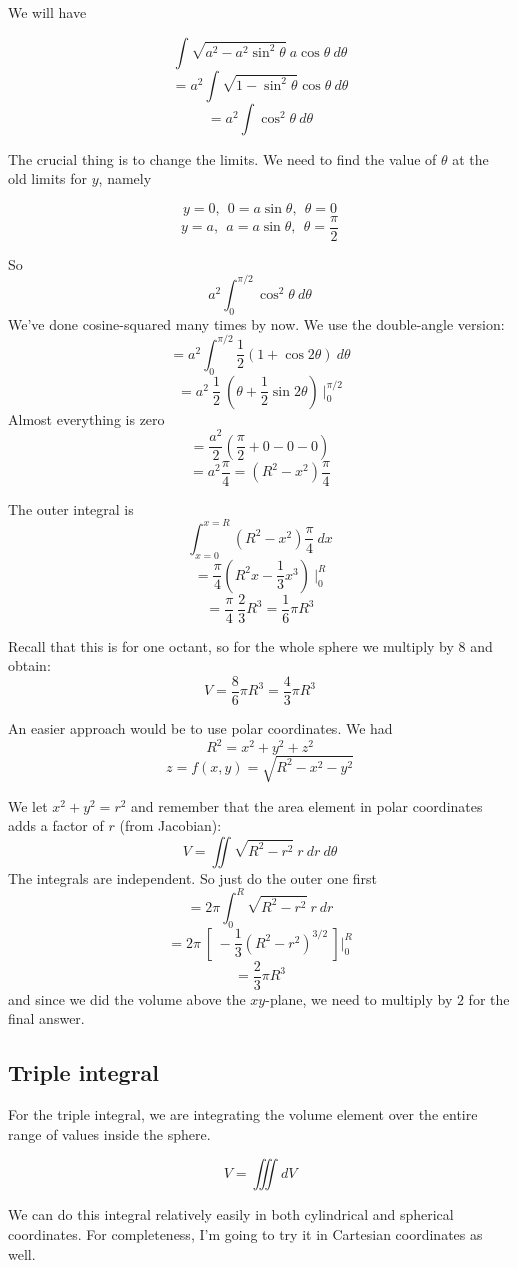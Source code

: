 \documentclass[11pt, oneside]{article}
\begin{document}
We will have

\[ \int \sqrt{a^2 - a^2 \sin^2 \theta} \ a \cos \theta \ d \theta \]
\[ = a^2 \int \sqrt{1 - \sin^2 \theta} \cos \theta \ d \theta \]
\[ = a^2 \int \cos^2 \theta \ d \theta \]

The crucial thing is to change the limits.  We need to find the value of $\theta$ at the old limits for $y$, namely

\[ y = 0, \ \ 0 = a \sin \theta, \ \ \theta = 0 \]
\[ y = a, \ \ a = a \sin \theta, \ \ \theta = \frac{\pi}{2} \]

So
\[ a^2 \int_0^{\pi/2} \cos^2 \theta \ d \theta \]
We've done cosine-squared many times by now.  We use the double-angle version:
\[ = a^2 \int_0^{\pi/2} \frac{1}{2}(1 + \cos 2 \theta) \ d \theta \]
\[ = a^2 \ \frac{1}{2} \ (\theta + \frac{1}{2} \sin 2 \theta) \ \bigg |_0^{\pi/2} \]
Almost everything is zero
\[ = \frac{a^2}{2} (\frac{\pi}{2} + 0 - 0 - 0) \]
\[ = a^2 \frac{\pi}{4} = (R^2-x^2) \frac{\pi}{4} \]

The outer integral is
\[ \int_{x=0}^{x=R} (R^2-x^2) \frac{\pi}{4} \ dx \]
\[ = \frac{\pi}{4} (R^2x - \frac{1}{3}x^3) \ \bigg |_0^R \]
\[ = \frac{\pi}{4} \ \frac{2}{3}R^3 = \frac{1}{6}\pi R^3 \]

Recall that this is for one octant, so for the whole sphere we multiply by $8$ and obtain:
\[ V = \frac{8}{6}\pi R^3 = \frac{4}{3}\pi R^3 \]

An easier approach would be to use polar coordinates.  We had
\[ R^2 = x^2 + y^2 + z^2 \]
\[ z = f(x,y) = \sqrt{R^2 - x^2 - y^2} \]

We let $x^2 + y^2 = r^2$ and remember that the area element in polar coordinates adds a factor of $r$ (from Jacobian):
\[ V = \iint \sqrt{R^2 - r^2} \ r \ dr \ d \theta \]
The integrals are independent.  So just do the outer one first
\[ = 2 \pi \int_0^R  \sqrt{R^2 - r^2} \ r \ dr  \]
\[ = 2 \pi \ [ \ - \frac{1}{3} (R^2 - r^2)^{3/2} \ ] \bigg |_0^R \]
\[ = \frac{2}{3} \pi R^3 \]
and since we did the volume above the $xy$-plane, we need to multiply by $2$ for the final answer.

\subsection*{Triple integral}
For the triple integral, we are integrating the volume element over the entire range of values inside the sphere.

\[ V = \iiint dV \]

We can do this integral relatively easily in both cylindrical and spherical coordinates.  For completeness, I'm going to try it in Cartesian coordinates as well.
\end{document}
